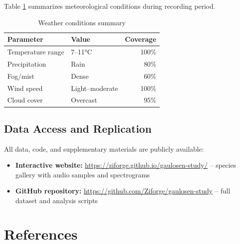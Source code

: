 \documentclass[twocolumn]{article}
\begin{document}
Table \ref{tab:weather} summarizes meteorological conditions during recording period.

\begin{table}[H]
\centering
\caption{Weather conditions summary}
\label{tab:weather}
\begin{tabular}{llr}
\toprule
\textbf{Parameter} & \textbf{Value} & \textbf{Coverage} \\
\midrule
Temperature range & 7--11°C & 100\% \\
Precipitation & Rain & 80\% \\
Fog/mist & Dense & 60\% \\
Wind speed & Light--moderate & 100\% \\
Cloud cover & Overcast & 95\% \\
\bottomrule
\end{tabular}
\end{table}

\subsection{Data Access and Replication}

All data, code, and supplementary materials are publicly available:

\begin{itemize}
\item \textbf{Interactive website:} \url{https://ziforge.github.io/gaulosen-study/} -- species gallery with audio samples and spectrograms
\item \textbf{GitHub repository:} \url{https://github.com/Ziforge/gaulosen-study} -- full dataset and analysis scripts
\end{itemize}

\section*{References}



\end{document}
